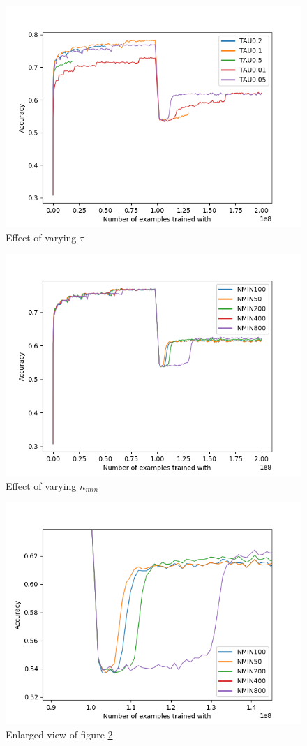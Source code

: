 \documentclass[12pt]{article}
\begin{document}
\begin{figure}
	\centering
	\includegraphics[width=.8\linewidth]{./img/vfdt_taus.png}
	\caption{Effect of varying $\tau$}
	\label{fig:vfdt_taus}	
\end{figure}
\begin{figure}
	\centering
	\includegraphics[width=.8\linewidth]{./img/vfdt_nmin.png}
	\caption{Effect of varying $n_{min}$}
	\label{fig:vfdt_nmins}	
\end{figure}
\begin{figure}
	\centering
	\includegraphics[width=.8\linewidth]{../code/experiments/vfdt/plots/vfdt_nmin_zoom.png}
	\caption{Enlarged view of figure \ref{fig:vfdt_nmins}}
	\label{fig:vfdt_nmins_zoom}	
\end{figure}
\end{document}
